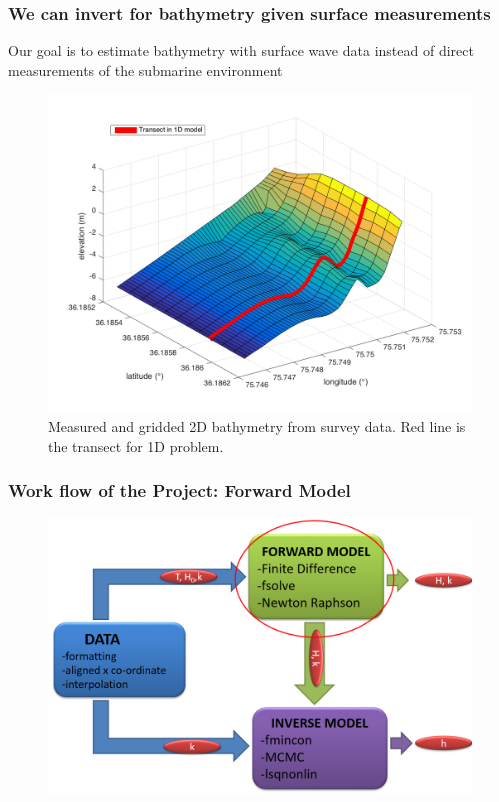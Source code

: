 \documentclass[7pt]{beamer}
\begin{document}
\begin{frame}
 \frametitle{We can invert for bathymetry given surface measurements}

Our goal is to estimate bathymetry with surface wave data instead of direct measurements of the submarine environment

\begin{figure}[H]
	 	\centering
	 	\includegraphics[width=0.6\linewidth]{img/trueBath2D.png}
	 	\caption{Measured and gridded 2D bathymetry from survey data. Red line is the transect for 1D problem.}
	 	\label{2D Bath}
	 	\end{figure}

\end{frame}

\begin{frame}
 \frametitle{Work flow of the Project: Forward Model}



\begin{figure}[H]
	 	\centering
	 	\includegraphics[width=1.0\linewidth]{img/FWD.png}
	 	\end{figure}

\end{frame}
\end{document}
